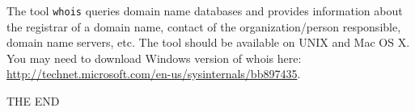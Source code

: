 \documentclass[a4paper,11pt]{exam}
\begin{document}
\begin{questions}

The tool \texttt{whois} queries domain name databases and provides information about the registrar of a domain name, contact of the organization/person responsible, domain name servers, etc.  The tool should be available on UNIX and Mac OS X.  You may need to download Windows version of whois here: \url{http://technet.microsoft.com/en-us/sysinternals/bb897435}.


\end{questions}

\vfill
\begin{center}
    \textsf{\Huge THE END}
\end{center}
\end{document}

